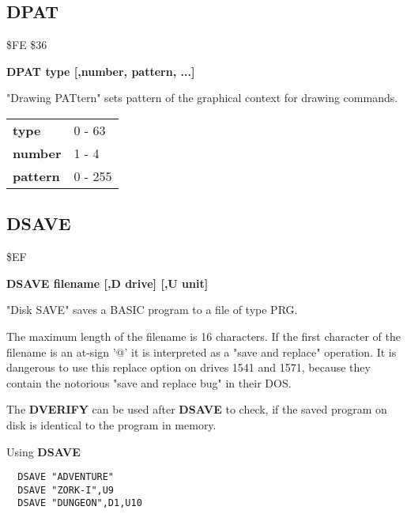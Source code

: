
\newpage
\subsection{DPAT}
\begin{description}[leftmargin=2cm,style=nextline]
\item [Token:] \$FE \$36
\item [Format:] {\bf DPAT type [,number, pattern, ...]}
\item [Usage:]
   "Drawing PATtern" sets pattern
   of the graphical context for drawing commands.

\ttfamily
\begin{tabular}{|l|l|}
\hline
   {\bf type}       &  0 - 63 \\
   {\bf number}     &  1 - 4 \\
   {\bf pattern}    &  0 - 255 \\
\hline
\end{tabular}
\end{description}


\newpage
\subsection{DSAVE}
\begin{description}[leftmargin=2cm,style=nextline]
\item [Token:] \$EF
\item [Format:] {\bf DSAVE filename [,D drive] [,U unit] }
\item [Usage:]
   "Disk SAVE" saves a BASIC program to
   a file of type PRG.

   \filenamedefinition
   The maximum length of the filename is 16 characters.
   If the first character of the filename is an at-sign '@' it
   is interpreted as a "save and replace" operation. It is dangerous
   to use this replace option on drives 1541 and 1571, because they
   contain the notorious "save and replace bug" in their DOS.

   \drivedefinition

   \unitdefinition

\item [Remarks:]
   The {\bf DVERIFY} can be used after {\bf DSAVE} to check,
   if the saved program on disk is identical to the program
   in memory.

\item [Example:] Using {\bf DSAVE}
\begin{tcolorbox}[colback=black,coltext=white]
\verbatimfont{\codefont}
\begin{verbatim}
  DSAVE "ADVENTURE"
  DSAVE "ZORK-I",U9
  DSAVE "DUNGEON",D1,U10
\end{verbatim}
\end{tcolorbox}
\end{description}

